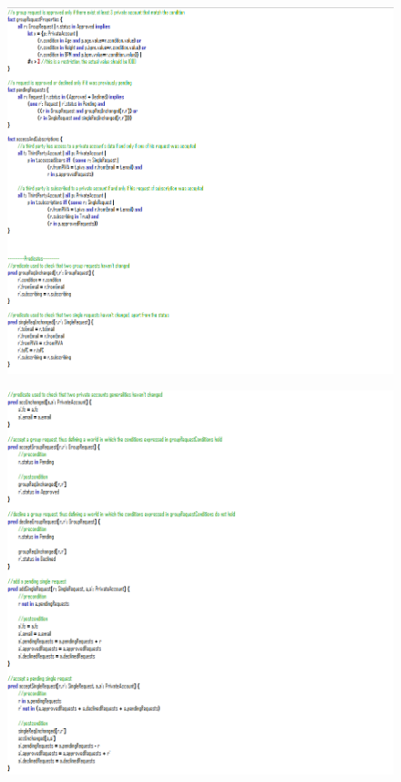 \documentclass[titlepage]{article}
\begin{document}
		\begin{figure}[H]
			\center
  			\includegraphics[width=\textwidth]{Alloy/Dynamic3.png}
			\label{fig:dyn3}
		\end{figure}

		\begin{figure}[H]
			\center
  			\includegraphics[width=\textwidth]{Alloy/Dynamic4.png}
			\label{fig:dyn4}
		\end{figure}
\end{document}
